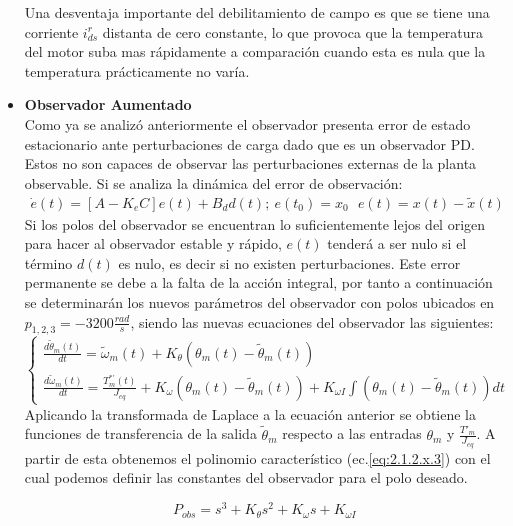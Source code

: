\documentclass[10pt]{article}
\begin{document}
\begin{itemize}
	Una desventaja importante del debilitamiento de campo es que se tiene una corriente $i^{r}_{ds}$ distanta de cero constante, lo que provoca que la temperatura del motor suba mas rápidamente a comparación cuando esta es nula que la temperatura prácticamente no varía.
	\newpage
	\item \textbf{Observador Aumentado}\\
	Como ya se analizó anteriormente el observador presenta error de estado estacionario ante perturbaciones de carga dado que es un observador PD. 
	Estos no son capaces de observar las perturbaciones externas de la planta observable. Si se analiza la dinámica del error de observación:
	\begin{eqnarray}
		\dot{e}(t)=[A-K_{e}C]e(t)+B_{d}d(t); \ e(t_{0})=x_{0}  \ \ \
		e(t)=x(t)-\tilde{x}(t)
		\label{eq:2.1.2.x.1}
	\end{eqnarray}
	Si los polos del observador se encuentran lo suficientemente lejos del origen para hacer al observador estable y rápido, $e(t)$ tenderá a ser nulo si el término $d(t)$ es nulo, es decir si no existen perturbaciones.
	Este error permanente se debe a la falta de la acción integral, por tanto a continuación se determinarán los nuevos parámetros del observador con polos ubicados en $p_{1,2,3}=-3200 \frac{rad}{s}$, siendo las nuevas ecuaciones del observador las siguientes:
	\begin{equation}
		\left\{\begin{matrix}
			\frac{d\tilde{\theta}_{m}(t)}{dt}=\tilde{\omega}_{m}(t)+K_{\theta}(\theta_{m}(t)-\tilde{\theta}_{m}(t))\\
			\frac{d\tilde{\omega}_{m}(t)}{dt}=\frac{T^{*'}_{m}(t)}{J_{eq}}+K_{\omega}(\theta_{m}(t)-\tilde{\theta}_{m}(t))+K_{\omega I}\int (\theta_{m}(t)-\tilde{\theta}_{m}(t))dt
			
			\end{matrix}\right.
			\label{eq:2.1.2.x.2}
	\end{equation}
	Aplicando la transformada de Laplace a la ecuación anterior se obtiene la funciones de transferencia de la salida $\tilde{\theta}_{m}$ respecto a las entradas $\theta_{m}$ y $\frac{T'_{m}}{J_{eq}}$. A partir de esta obtenemos el polinomio característico (ec.\ref{eq:2.1.2.x.3}) con el cual podemos definir las constantes del observador para el polo deseado.

		\begin{equation}
		P_{obs}=s^{3}+K_{\theta}s^{2}+K_{\omega}s+K_{\omega I}
			\label{eq:2.1.2.x.3}
	\end{equation}


\end{itemize}
\end{document}
